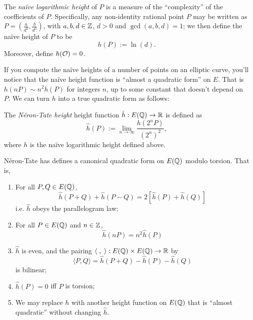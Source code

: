 \documentclass[10pt]{article}
\begin{document}
\begin{definition}
The {\it na\"ive logarithmic height} of $P$ is a measure of the ``complexity'' of the coefficients of $P$. Specifically, any non-identity rational point $P$ may be written as $P = (\frac{a}{d^2},\frac{b}{d^3})$, with $a,b,d \in \mathbb{Z}$, $d>0$ and $\gcd(a,b,d) = 1$; we then define the na\"ive height of $P$ to be
\begin{equation}
	h(P) := \ln(d).
\end{equation}
Moreover, define $h(\mathcal{O}) = 0$.
\end{definition}
If you compute the na\"ive heights of a number of points on an elliptic curve, you'll notice that the na\"ive height function is ``almost a quadratic form'' on $E$. That is $h(nP) \sim n^2 h(P)$ for integers $n$, up to some constant that doesn't depend on $P$. We can turn $h$ into a true quadratic form as follows:

\begin{definition}
The {\it N\'eron-Tate height} height function $\hat{h}: E(\mathbb{Q}) \to \mathbb{R}$ is defined as
\begin{equation}
	\hat{h}(P) := \lim_{n \to \infty} \frac{h(2^n P)}{(2^n)^2},
\end{equation}
where $h$ is the na\"ive logarithmic height defined above.
\end{definition}

\begin{theorem}
N\'eron-Tate has defines a canonical quadratic form on $E(\mathbb{Q})$ modulo torsion. That is,
\begin{enumerate}
	\item For all $P,Q \in E(\mathbb{Q})$,
	\begin{equation}
		\hat{h}(P+Q) + \hat{h}(P-Q) = 2\left[ \hat{h}(P) + \hat{h}(Q)\right]
	\end{equation}
	i.e. $\hat{h}$ obeys the parallelogram law;
	\item For all $P \in E(\mathbb{Q})$ and $n \in \mathbb{Z}$,
	\begin{equation}
		\hat{h}(nP) = n^2 \hat{h}(P)
	\end{equation}
	\item $\hat{h}$ is even, and the pairing $\langle\;,\;\rangle: E(\mathbb{Q})\times E(\mathbb{Q}) \to \mathbb{R}$ by
	\begin{equation}
		\langle P,Q \rangle = \hat{h}(P+Q) - \hat{h}(P) - \hat{h}(Q)
	\end{equation}
	is bilinear;
	\item $\hat{h}(P) = 0$ iff $P$ is torsion;
	\item We may replace $h$ with another height function on $E(\mathbb{Q})$ that is ``almost quadratic'' without changing $\hat{h}$.
\end{enumerate}
\end{theorem}
\end{document}
